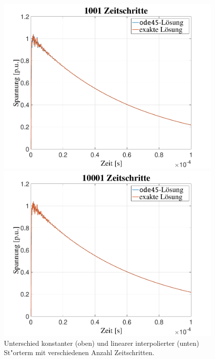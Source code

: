 \begin{refsection}
\begin{figure}
\begin{minipage}{.32\textwidth}
	        \includegraphics[width=\linewidth]{./Trafo/images/Interp1001.pdf}
	    \end{minipage}
	    \begin{minipage}{.32\textwidth}
	        \centering
	        \includegraphics[width=\linewidth]{./Trafo/images/Interp10001.pdf}
	    \end{minipage}
	    \caption{Unterschied konstanter (oben) und linearer interpolierter (unten) St"orterm mit verschiedenen Anzahl Zeitschritten.}
	    \label{trafo:interpVergleich}
	\end{figure}


\end{refsection}
